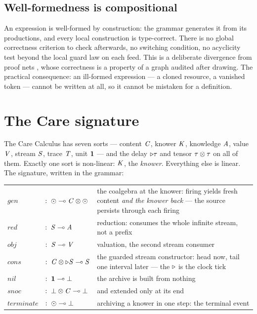 \documentclass{eptcs}
\begin{document}
\subsection{Well-formedness is compositional}

An expression is well-formed by construction: the grammar generates it
from its productions, and every local construction is type-correct.
There is no global correctness criterion to
check afterwards, no switching condition, no acyclicity test beyond the
local guard law on each feed. This is a deliberate divergence from
proof nets \cite{danos1989}, whose correctness is a property of a graph
audited after drawing. The practical consequence: an ill-formed expression --- a cloned
resource, a vanished token --- cannot be written at all, so it cannot be
mistaken for a definition.

\section{The Care signature}\label{sec:signature}

The Care Calculus has seven sorts --- content $\mathit{C}$, knower $\mathit{K}$,
knowledge $\mathit{A}$, value $\mathit{V}$, stream $\mathit{S}$, trace $\mathit{T}$, unit $\mathbf{1}$ ---
and the delay $\triangleright\tau$ and tensor $\tau\otimes\tau$ on all of them.
Exactly one sort is non-linear: $\mathit{K}$, the \emph{knower}. Everything else
is linear. The signature, written in the grammar:

\begin{center}
\begin{tabular}{llp{62mm}}
$\mathit{gen}$ & $:\; \odot \multimap \mathit{C} \otimes \odot$ & the coalgebra
at the knower: firing yields fresh content \emph{and the knower back}
--- the source persists through each firing\\
$\mathit{red}$ & $:\; \mathit{S} \multimap \mathit{A}$ & reduction: consumes the whole
infinite stream, not a prefix\\
$\mathit{obj}$ & $:\; \mathit{S} \multimap \mathit{V}$ & valuation, the second stream
consumer\\
$\mathit{cons}$ & $:\; \mathit{C} \otimes \triangleright\mathit{S} \multimap \mathit{S}$ & the guarded stream
constructor: head now, tail one interval later --- the $\triangleright$ is the
clock tick\\
$\mathit{nil}$ & $:\; \mathbf{1} \multimap \bot$ & the archive is built from
nothing\\
$\mathit{snoc}$ & $:\; \bot \otimes \mathit{C} \multimap \bot$ & and extended only
at its end\\
$\mathit{terminate}$ & $:\; \odot \multimap \bot$ & archiving a knower
in one step: the terminal event\\
\end{tabular}
\end{center}
\end{document}
